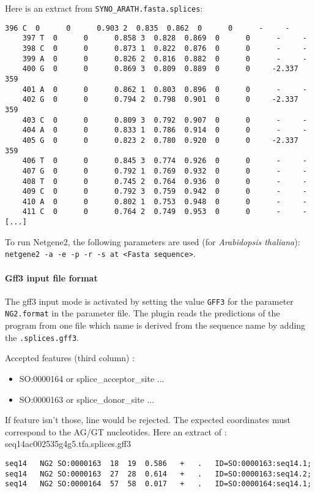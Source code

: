 Here is an extract from \texttt{SYNO\_ARATH.fasta.splices}:
\begin{Verbatim}[fontsize=\small]
    396 C  0      0      0.903 2  0.835  0.862  0      0      -     - 
    397 T  0      0      0.858 3  0.828  0.869  0      0      -     - 
    398 C  0      0      0.873 1  0.822  0.876  0      0      -     - 
    399 A  0      0      0.826 2  0.816  0.882  0      0      -     - 
    400 G  0      0      0.869 3  0.809  0.889  0      0     -2.337 359 
    401 A  0      0      0.862 1  0.803  0.896  0      0      -     - 
    402 G  0      0      0.794 2  0.798  0.901  0      0     -2.337 359 
    403 C  0      0      0.809 3  0.792  0.907  0      0      -     - 
    404 A  0      0      0.833 1  0.786  0.914  0      0      -     - 
    405 G  0      0      0.823 2  0.780  0.920  0      0     -2.337 359 
    406 T  0      0      0.845 3  0.774  0.926  0      0      -     - 
    407 G  0      0      0.792 1  0.769  0.932  0      0      -     - 
    408 T  0      0      0.745 2  0.764  0.936  0      0      -     - 
    409 C  0      0      0.792 3  0.759  0.942  0      0      -     - 
    410 A  0      0      0.802 1  0.753  0.948  0      0      -     - 
    411 C  0      0      0.764 2  0.749  0.953  0      0      -     - 
[...]
\end{Verbatim}

To run Netgene2, the following parameters are used (for \emph{Arabidopsis
thaliana}): \texttt{netgene2 -a -e -p -r -s at <Fasta sequence>}.

\paragraph{Gff3 input file format}
The gff3 input mode is activated by setting the value \texttt{GFF3} for the parameter
\texttt{NG2.format} in the parameter file.
The plugin reads the predictions of the program from one file which
name is derived from the sequence name by adding the \texttt{.splices.gff3}.

Accepted features (third column) :
\begin{itemize}
\item  SO:0000164 or splice\_acceptor\_site ...
\item  SO:0000163 or splice\_donor\_site ...
\end{itemize}
If feature isn't those, line would be rejected. The expected coordinates must correspond to the AG/GT nucleotides.
Here an extract of : seq14ac002535g4g5.tfa.splices.gff3
\begin{Verbatim}[fontsize=\tiny]
seq14	NG2	SO:0000163	18	19	0.586	+	.	ID=SO:0000163:seq14.1;
seq14	NG2	SO:0000163	27	28	0.614	+	.	ID=SO:0000163:seq14.2;
seq14	NG2	SO:0000164	57	58	0.017	+	.	ID=SO:0000164:seq14.1;
\end{Verbatim}

